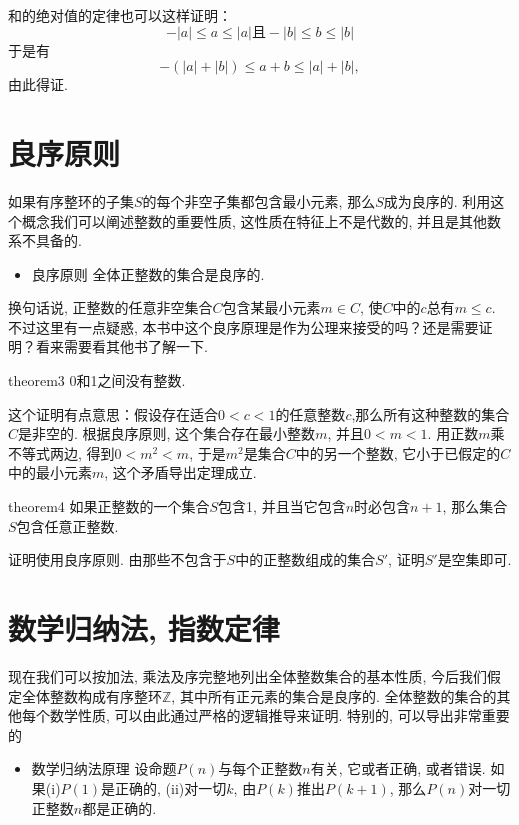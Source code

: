 和的绝对值的定律也可以这样证明：
\[
-|a| \le a \le |a| \text{且} -|b| \le b \le |b|
\]
于是有
\[
-(|a|+|b|) \le  a + b \le |a|+|b|,
\]
由此得证. 


\section{良序原则}
如果有序整环的子集$S$的每个非空子集都包含最小元素, 那么$S$成为良序的. 利用这个概念我们可以阐述整数的重要性质, 这性质在特征上不是代数的, 并且是其他数系不具备的. 
\begin{itemize}
\item 良序原则 全体正整数的集合是良序的. 
\end{itemize}

换句话说, 正整数的任意非空集合$C$包含某最小元素$m \in C$, 使$C$中的$c$总有$m \le c$. 不过这里有一点疑惑, 本书中这个良序原理是作为公理来接受的吗？还是需要证明？看来需要看其他书了解一下. 

\begin{theorem}{}{theorem3}
0和1之间没有整数. 
\end{theorem}

这个证明有点意思：假设存在适合$0<c<1$的任意整数$c$,那么所有这种整数的集合$C$是非空的. 根据良序原则, 这个集合存在最小整数$m$, 并且$0 < m < 1$. 用正数$m$乘不等式两边, 得到$0 < m^2 < m$, 于是$m^2$是集合$C$中的另一个整数, 它小于已假定的$C$中的最小元素$m$, 这个矛盾导出定理成立. 

\begin{theorem}{}{theorem4}
如果正整数的一个集合$S$包含1, 并且当它包含$n$时必包含$n+1$, 那么集合$S$包含任意正整数. 
\end{theorem}

证明使用良序原则. 由那些不包含于$S$中的正整数组成的集合$S'$, 证明$S'$是空集即可. 

\section{数学归纳法, 指数定律}
现在我们可以按加法, 乘法及序完整地列出全体整数集合的基本性质, 今后我们假定全体整数构成有序整环$\mathbb{Z}$, 其中所有正元素的集合是良序的. 全体整数的集合的其他每个数学性质, 可以由此通过严格的逻辑推导来证明. 特别的, 可以导出非常重要的
\begin{itemize}
\item \textcolor{main}{数学归纳法原理} 设命题$P(n)$与每个正整数$n$有关, 它或者正确, 或者错误. 如果(i)$P(1)$是正确的, (ii)对一切$k$, 由$P(k)$推出$P(k+1)$, 那么$P(n)$对一切正整数$n$都是正确的. 
\end{itemize}

